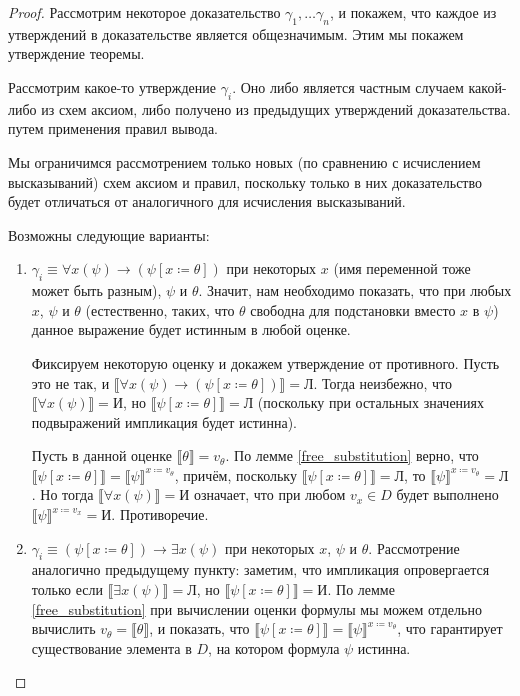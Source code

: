 \begin{proof}
Рассмотрим некоторое доказательство $\gamma_1, \dots \gamma_n$, и покажем, что
каждое из утверждений в доказательстве является общезначимым. Этим мы покажем 
утверждение теоремы.

Рассмотрим какое-то утверждение $\gamma_i$. Оно либо является частным случаем
какой-либо из схем аксиом, либо получено из предыдущих утверждений доказательства.
путем применения правил вывода.

Мы ограничимся рассмотрением только новых (по сравнению с исчислением высказываний)
схем аксиом и правил, поскольку только в них доказательство будет отличаться
от аналогичного для исчисления высказываний.

Возможны следующие варианты:
\begin{enumerate}
\item $\gamma_i \equiv \forall{x}(\psi) \rightarrow (\psi[x \coloneqq  \theta])$ при 
некоторых $x$ (имя переменной тоже может быть разным), $\psi$ и $\theta$. 
Значит, нам необходимо показать, что при любых $x$, $\psi$ и $\theta$ 
(естественно, таких, что $\theta$ свободна для подстановки вместо $x$ в $\psi$) 
данное выражение будет истинным в любой оценке.

Фиксируем некоторую оценку и докажем утверждение от противного. 
Пусть это не так, и 
$\llbracket \forall{x}(\psi)\rightarrow(\psi[x \coloneqq  \theta])\rrbracket = \texttt{Л}$.
Тогда неизбежно, что $\llbracket \forall{x}(\psi) \rrbracket = \texttt{И}$, но
$\llbracket \psi[x\coloneqq \theta] \rrbracket = \texttt{Л}$ (поскольку при остальных значениях
подвыражений импликация будет истинна). 

Пусть в данной оценке $\llbracket\theta\rrbracket=v_\theta$. 
По лемме \ref{free_substitution} верно, что 
$\llbracket \psi[x\coloneqq \theta] \rrbracket = \llbracket\psi\rrbracket^{x\coloneqq v_\theta}$,
причём, поскольку $\llbracket \psi[x\coloneqq \theta] \rrbracket = \texttt{Л}$, то
$\llbracket\psi\rrbracket^{x\coloneqq v_\theta} = \texttt{Л}$.
Но тогда $\llbracket \forall{x}(\psi) \rrbracket = \texttt{И}$ означает, что 
при любом $v_x \in D$ будет выполнено $\llbracket \psi \rrbracket^{x \coloneqq  v_x} = \texttt{И}$. 
Противоречие.

\item $\gamma_i \equiv (\psi[x \coloneqq  \theta]) \rightarrow \exists{x}(\psi)$ при некоторых
$x$, $\psi$ и $\theta$. Рассмотрение аналогично предыдущему пункту: заметим, что импликация
опровергается только если $\llbracket \exists{x}(\psi) \rrbracket = \texttt{Л}$, но
$\llbracket \psi[x\coloneqq \theta] \rrbracket = \texttt{И}$. По лемме 
\ref{free_substitution} при вычислении оценки формулы мы можем отдельно вычислить
$v_\theta = \llbracket\theta\rrbracket$, и показать, что 
$\llbracket \psi[x\coloneqq \theta] \rrbracket = \llbracket\psi\rrbracket^{x\coloneqq v_\theta}$, что 
гарантирует существование элемента в $D$, на котором формула $\psi$ истинна.


\end{enumerate}
\end{proof}

